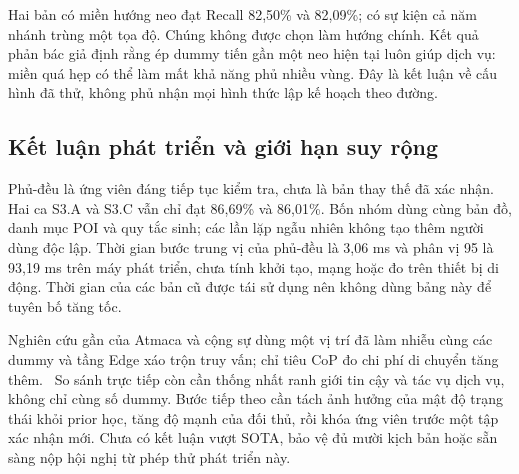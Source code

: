 Hai bản có miền hướng neo đạt Recall 82,50\% và 82,09\%; có sự kiện cả năm nhánh trùng một tọa độ. Chúng không được chọn làm hướng chính. Kết quả phản bác giả định rằng ép dummy tiến gần một neo hiện tại luôn giúp dịch vụ: miền quá hẹp có thể làm mất khả năng phủ nhiều vùng. Đây là kết luận về cấu hình đã thử, không phủ nhận mọi hình thức lập kế hoạch theo đường.

\subsection{Kết luận phát triển và giới hạn suy rộng}

Phủ-đều là ứng viên đáng tiếp tục kiểm tra, chưa là bản thay thế đã xác nhận. Hai ca S3.A và S3.C vẫn chỉ đạt 86,69\% và 86,01\%. Bốn nhóm dùng cùng bản đồ, danh mục POI và quy tắc sinh; các lần lặp ngẫu nhiên không tạo thêm người dùng độc lập. Thời gian bước trung vị của phủ-đều là 3,06 ms và phân vị 95 là 93,19 ms trên máy phát triển, chưa tính khởi tạo, mạng hoặc đo trên thiết bị di động. Thời gian của các bản cũ được tái sử dụng nên không dùng bảng này để tuyên bố tăng tốc.

Nghiên cứu gần của Atmaca và cộng sự dùng một vị trí đã làm nhiễu cùng các dummy và tầng Edge xáo trộn truy vấn; chỉ tiêu CoP đo chi phí di chuyển tăng thêm.~\citep{atmaca2024ev} So sánh trực tiếp còn cần thống nhất ranh giới tin cậy và tác vụ dịch vụ, không chỉ cùng số dummy. Bước tiếp theo cần tách ảnh hưởng của mật độ trạng thái khỏi prior học, tăng độ mạnh của đối thủ, rồi khóa ứng viên trước một tập xác nhận mới. Chưa có kết luận vượt SOTA, bảo vệ đủ mười kịch bản hoặc sẵn sàng nộp hội nghị từ phép thử phát triển này.
\par\endgroup
